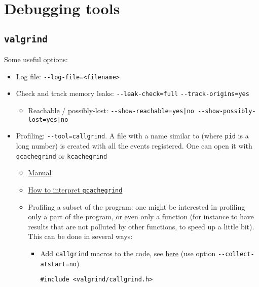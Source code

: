 \documentclass[a4paper,12pt,%
              final%
              ]{article}
\begin{document}
\section{Debugging tools}
\subsection{\texttt{valgrind}}
Some useful options:
\begin{itemize}
  \item Log file: \verb|--log-file=<filename>|
  \item Check and track memory leaks: \verb|--leak-check=full| \verb|--track-origins=yes|
    \begin{itemize}
      \item Reachable / possibly-lost: \verb!--show-reachable=yes|no --show-possibly-lost=yes|no!
    \end{itemize}
  \item Profiling: \verb|--tool=callgrind|. A file with a name similar to  (where \texttt{pid} is a long number) is created with all the events registered. One can open it with \texttt{qcachegrind} or \texttt{kcachegrind}
    \begin{itemize}
      \item \href{https://www.cs.cmu.edu/afs/cs.cmu.edu/project/cmt-40/Nice/RuleRefinement/bin/valgrind-3.2.0/docs/html/cl-manual.html}{Manual}
      \item \href{https://stackoverflow.com/a/50781312/12152457}{How to interpret \texttt{qcachegrind}}
      \item Profiling a subset of the program: one might be interested in profiling only a part of the program, or even only a function (for instance to have results that are not polluted by other functions, to speed up a little bit). This can be done in several ways:
        \begin{itemize}
          \item Add \texttt{callgrind} macros to the code, see \href{https://cta-redmine.irap.omp.eu/projects/gammalib/wiki/How_to_use_valgrind}{here} (use option \verb|--collect-atstart=no|)
\begin{verbatim}
#include <valgrind/callgrind.h>


\end{verbatim}
\end{itemize}
\end{itemize}
\end{itemize}
\end{document}
